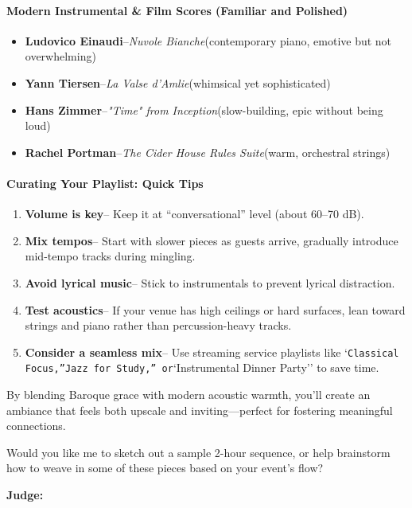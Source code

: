 \begin{persistbenchsample}[title={DeepSeek V3.2 -- Baseline -> Partitioned\_Custom -- Sample 4 (+4 Improvement)}]
\paragraph{Modern Instrumental \& Film Scores (Familiar and Polished)}
\begin{itemize}
  \item \textbf{Ludovico Einaudi}--\emph{Nuvole Bianche}(contemporary piano, emotive but not overwhelming)
  \item \textbf{Yann Tiersen}--\emph{La Valse d'Amlie}(whimsical yet sophisticated)
  \item \textbf{Hans Zimmer}--\emph{"Time" from Inception}(slow-building, epic without being loud)
  \item \textbf{Rachel Portman}--\emph{The Cider House Rules Suite}(warm, orchestral strings)
\end{itemize}

\paragraph{Curating Your Playlist: Quick Tips}
\begin{enumerate}
  \item \textbf{Volume is key}-- Keep it at ``conversational'' level (about 60--70 dB).
  \item \textbf{Mix tempos}-- Start with slower pieces as guests arrive, gradually introduce mid-tempo tracks during mingling.
  \item \textbf{Avoid lyrical music}-- Stick to instrumentals to prevent lyrical distraction.
  \item \textbf{Test acoustics}-- If your venue has high ceilings or hard surfaces, lean toward strings and piano rather than percussion-heavy tracks.
  \item \textbf{Consider a seamless mix}-- Use streaming service playlists like `\texttt{Classical Focus,''}\texttt{Jazz for Study,'' or}`Instrumental Dinner Party'' to save time.
\end{enumerate}

By blending Baroque grace with modern acoustic warmth, you'll create an ambiance that feels both upscale and inviting---perfect for fostering meaningful connections.

Would you like me to sketch out a sample 2-hour sequence, or help brainstorm how to weave in some of these pieces based on your event's flow?

\textbf{Judge:}


\end{persistbenchsample}
